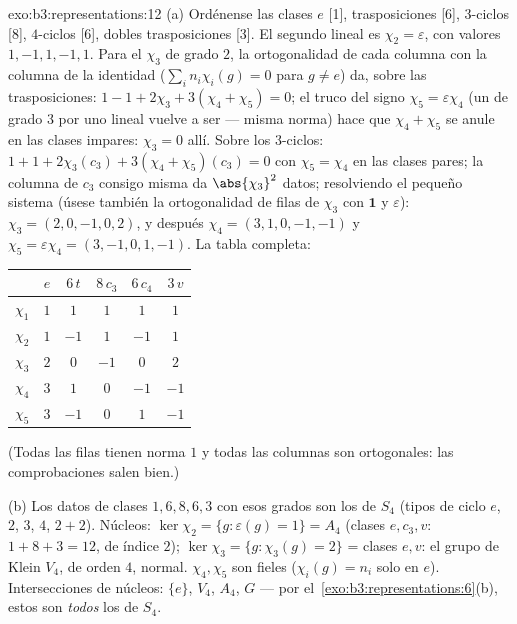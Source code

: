 \begin{solution}{exo:b3:representations:12}
(a) Ordénense las clases $e$ [1], trasposiciones [6], $3$-ciclos [8],
$4$-ciclos [6], dobles trasposiciones [3]. El segundo
 lineal es
$\chi_2 = \varepsilon$, con valores $1, -1, 1, -1, 1$. Para el
 $\chi_3$ de grado
$2$, la ortogonalidad de cada columna con la columna de la identidad
($\sum_in_i\chi_i(g) = 0$ para $g \neq e$) da, sobre las trasposiciones:
$1 - 1 + 2\chi_3 + 3(\chi_4 +
\chi_5) = 0$; el truco del signo $\chi_5 = \varepsilon\chi_4$ (un
 de grado $3$ por uno
lineal vuelve a ser  ---
misma norma) hace que $\chi_4 + \chi_5$ se anule en las clases impares:
$\chi_3 = 0$ allí. Sobre los $3$-ciclos: $1 + 1 +
2\chi_3(c_3) + 3(\chi_4 + \chi_5)(c_3) = 0$ con $\chi_5 = \chi_4$ en las
clases pares; la columna de $c_3$ consigo misma da $\abs{\chi_3}^2$
datos; resolviendo el pequeño sistema (úsese también la ortogonalidad de
filas de $\chi_3$ con $\mathbf 1$ y $\varepsilon$):
$\chi_3 = (2, 0, -1, 0, 2)$, y después $\chi_4 =
(3, 1, 0, -1, -1)$ y $\chi_5 = \varepsilon\chi_4 = (3, -1,
0, 1, -1)$. La tabla completa:
\begin{center}
\begin{tabular}{c|ccccc}
 & $e$ & $6\,t$ & $8\,c_3$ & $6\,c_4$ & $3\,v$\\
\hline
$\chi_1$ & $1$ & $1$ & $1$ & $1$ & $1$\\
$\chi_2$ & $1$ & $-1$ & $1$ & $-1$ & $1$\\
$\chi_3$ & $2$ & $0$ & $-1$ & $0$ & $2$\\
$\chi_4$ & $3$ & $1$ & $0$ & $-1$ & $-1$\\
$\chi_5$ & $3$ & $-1$ & $0$ & $1$ & $-1$\\
\end{tabular}
\end{center}
(Todas las filas tienen norma $1$ y todas las columnas son ortogonales:
las comprobaciones salen bien.)

(b) Los datos de clases $1, 6, 8, 6, 3$ con esos grados son los de $S_4$
(tipos de ciclo $e$, $2$, $3$, $4$, $2{+}2$). Núcleos:
$\ker\chi_2 = \{g : \varepsilon(g) = 1\} = A_4$ (clases $e, c_3, v$:
$1 + 8 + 3 = 12$, de índice $2$); $\ker\chi_3 = \{g : \chi_3(g) = 2\}$ =
clases $e, v$: el grupo de Klein $V_4$, de orden $4$, normal.
$\chi_4, \chi_5$ son fieles ($\chi_i(g) = n_i$ solo en $e$).
Intersecciones de núcleos: $\{e\}$, $V_4$, $A_4$, $G$ --- por
el~\cref{exo:b3:representations:6}(b), estos son \emph{todos} los
 de $S_4$.


\end{solution}

